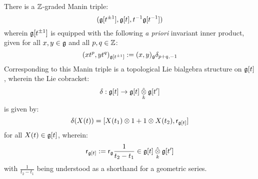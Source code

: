         \begin{definition} \label{def: manin_triples}
            
        \end{definition}
        \begin{example} \label{example: kac_moody_manin_triple}
            
        \end{example}
        \begin{example} \label{example: finite_type_yangian_manin_triple}
            There is a $\mathbb{Z}$-graded Manin triple:
                $$( \mathfrak{g}[t^{\pm 1}], \mathfrak{g}[t], t^{-1}\mathfrak{g}[t^{-1}] )$$
            wherein $\mathfrak{g}[t^{\pm 1}]$ is equipped with the following \textit{a priori} invariant inner product, given for all $x, y \in \mathfrak{g}$ and all $p, q \in \mathbb{Z}$:
                $$(x t^p, y t^q)_{\mathfrak{g}[t^{\pm 1}]} := (x, y)_{\mathfrak{g}} \delta_{p + q, -1}$$
            Corresponding to this Manin triple is a topological Lie bialgebra structure on $\mathfrak{g}[t]$, wherein the Lie cobracket:
                $$\delta: \g[t] \to \g[t] \hattensor_{k} \g[t']$$
            is given by:
                $$\delta(X(t)) = [ X(t_1) \tensor 1 + 1 \tensor X(t_2), \sfr_{\g[t]} ]$$
            for all $X(t) \in \mathfrak{g}[t]$, wherein:
                $$\sfr_{\g[t]} := \sfr_{\g} \frac{1}{t_2 - t_1} \in \g[t] \hattensor_{k} \g[t']$$
            with $\frac{1}{t_2 - t_1}$ being understood as a shorthand for a geometric series.
        \end{example}

